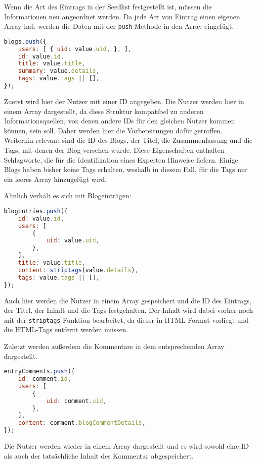 Wenn die Art des Eintrags in der Seedlist festgestellt ist, müssen die Informationen neu angeordnet werden. Da jede Art von Eintrag einen eigenen Array hat, werden die Daten mit der \texttt{push}-Methode in den Array eingefügt. \\

\begin{lstlisting}[title=Struktur von Informationen über einen Blog, language=JavaScript]
blogs.push({
	users: [ { uid: value.uid, }, ],
	id: value.id,
	title: value.title,
	summary: value.details,
	tags: value.tags || [],
});
\end{lstlisting}

Zuerst wird hier der Nutzer mit einer ID angegeben. Die Nutzer werden hier in einem Array dargestellt, da diese Struktur kompatibel zu anderen Informationsquellen, von denen andere IDs für den gleichen Nutzer kommen können, sein soll. Daher werden hier die Vorbereitungen dafür getroffen. Weiterhin relevant sind die ID des Blogs, der Titel, die Zusammenfassung und die Tags, mit denen der Blog versehen wurde. Diese Eigenschaften enthalten Schlagworte, die für die Identifikation eines Experten Hinweise liefern. Einige Blogs haben bisher keine Tags erhalten, weshalb in diesem Fall, für die Tags nur ein leeres Array hinzugefügt wird.

Ähnlich verhält es sich mit Blogeinträgen: \\

\begin{lstlisting}[title=Struktur von Informationen über einen Blogeintrag, language=JavaScript]
blogEntries.push({
	id: value.id,
	users: [
		{
			uid: value.uid,
		},
	],
	title: value.title,
	content: striptags(value.details),
	tags: value.tags || [],
});
\end{lstlisting}

Auch hier werden die Nutzer in einem Array gespeichert und die ID des Eintrags, der Titel, der Inhalt und die Tags festgehalten. Der Inhalt wird dabei vorher noch mit der \texttt{striptags}-Funktion bearbeitet, da dieser in \ac{HTML}-Format vorliegt und die \ac{HTML}-Tags entfernt werden müssen.

Zuletzt werden außerdem die Kommentare in dem entsprechenden Array dargestellt. \\

\noindent
\begin{minipage}{\linewidth}
\begin{lstlisting}[title=Struktur von Informationen über einen Kommentar, language=JavaScript]
entryComments.push({
	id: comment.id,
	users: [
		{
			uid: comment.uid,
		},
	],
	content: comment.blogCommentDetails,
});
\end{lstlisting}
\end{minipage}

Die Nutzer werden wieder in einem Array dargestellt und es wird sowohl eine ID als auch der tatsächliche Inhalt des Kommentar abgespeichert.